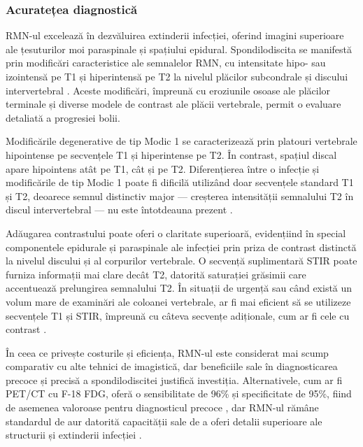 \message{ !name(LaMain.tex)}\documentclass[romanian,12pt,a4paper]{article}
\begin{document}
\subsubsection{Acuratețea diagnostică}

RMN-ul excelează în dezvăluirea extinderii infecției, oferind imagini
superioare ale țesuturilor moi paraspinale și spațiului epidural.
Spondilodiscita se manifestă prin modificări caracteristice ale
semnalelor RMN, cu intensitate hipo- sau izointensă pe T1 și
hiperintensă pe T2 la nivelul plăcilor subcondrale și discului
intervertebral \cite{DiagnosticPerformanceMultiDetector2022}. Aceste
modificări, împreună cu eroziunile osoase ale plăcilor terminale și
diverse modele de contrast ale plăcii vertebrale, permit o evaluare
detaliată a progresiei bolii.

Modificările degenerative de tip Modic 1 se caracterizează prin platouri
vertebrale hipointense pe secvențele T1 și hiperintense pe T2. În
contrast, spațiul discal apare hipointens atât pe T1, cât și pe T2.
Diferențierea între o infecție și modificările de tip Modic 1 poate fi
dificilă utilizând doar secvențele standard T1 și T2, deoarece semnul
distinctiv major --- creșterea intensității semnalului T2 în discul
intervertebral --- nu este întotdeauna prezent
\cite{DegenerativeDiskDisease1988}.

Adăugarea contrastului poate oferi o claritate superioară, evidențiind
în special componentele epidurale și paraspinale ale infecției prin
priza de contrast distinctă la nivelul discului și al corpurilor
vertebrale. O secvență suplimentară STIR poate furniza informații mai
clare decât T2, datorită saturației grăsimii care accentuează
prelungirea semnalului T2. În situații de urgență sau când există un
volum mare de examinări ale coloanei vertebrale, ar fi mai eficient să
se utilizeze secvențele T1 și STIR, împreună cu câteva secvențe
adiționale, cum ar fi cele cu contrast
\cite{DiffusionweightedMRIClaw2014}.

În ceea ce privește costurile și eficiența, RMN-ul este considerat mai
scump comparativ cu alte tehnici de imagistică, dar beneficiile sale în
diagnosticarea precoce și precisă a spondilodiscitei justifică
investiția. Alternativele, cum ar fi PET/CT cu F-18 FDG, oferă o
sensibilitate de 96\% și specificitate de 95\%, fiind de asemenea
valoroase pentru diagnosticul precoce , dar RMN-ul rămâne standardul de
aur datorită capacității sale de a oferi detalii superioare ale
structurii și extinderii infecției \cite{ComparisonDiagnosticValue2017}.
\end{document}
